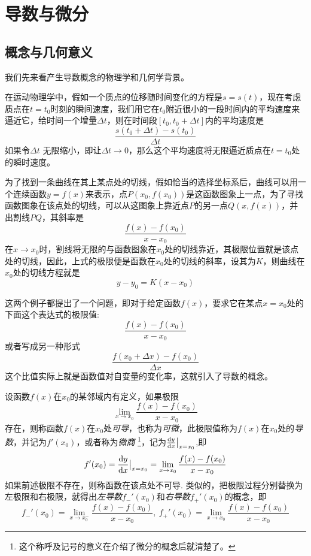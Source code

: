 
\section{导数与微分}
\label{sec:derivative-and-differtial}

\subsection{概念与几何意义}
\label{sec:concept-of-derivative}

我们先来看产生导数概念的物理学和几何学背景。

在运动物理学中，假如一个质点的位移随时间变化的方程是$s=s(t)$，现在考虑质点在$t=t_0$时刻的瞬间速度，我们用它在$t_0$附近很小的一段时间内的平均速度来逼近它，给时间一个增量$\Delta t$，则在时间段$[t_0,t_0+\Delta t]$内的平均速度是
\[ \frac{s(t_0+\Delta t)-s(t_0)}{\Delta t} \]
如果令$\Delta t$ 无限缩小，即让$\Delta t \to 0$，那么这个平均速度将无限逼近质点在$t=t_0$处的瞬时速度。

为了找到一条曲线在其上某点处的切线，假如恰当的选择坐标系后，曲线可以用一个连续函数$y=f(x)$来表示，点$P(x_0,f(x_0))$是这函数图象上一点，为了寻找函数图象在该点处的切线，可以从这图象上靠近点$P$的另一点$Q(x,f(x))$，并出割线$PQ$，其斜率是
\[ \frac{f(x)-f(x_0)}{x-x_0} \]
在$x \to x_0$时，割线将无限的与函数图象在$x_0$处的切线靠近，其极限位置就是该点处的切线，因此，上式的极限便是函数在$x_0$处的切线的斜率，设其为$K$，则曲线在$x_0$处的切线方程就是
\[ y-y_0 = K(x-x_0) \]

这两个例子都提出了一个问题，即对于给定函数$f(x)$，要求它在某点$x=x_0$处的下面这个表达式的极限值:
\[ \frac{f(x)-f(x_0)}{x-x_0} \]
或者写成另一种形式
\[ \frac{f(x_0+\Delta x)-f(x_0)}{\Delta x} \]
这个比值实际上就是函数值对自变量的变化率，这就引入了导数的概念。

\begin{definition}
  设函数$f(x)$在$x_0$的某邻域内有定义，如果极限
  \[ \lim_{x \to x_0} \frac{f(x)-f(x_0)}{x-x_0} \]
  存在，则称函数$f(x)$在$x_0$处\emph{可导}，也称为\emph{可微}，此极限值称为$f(x)$在$x_0$处的\emph{导数}，并记为$f'(x_0)$，或者称为\emph{微商} \footnote{这个称呼及记号的意义在介绍了微分的概念后就清楚了。}，记为$\frac{\mathop{}\!\mathrm{d} y}{\mathop{}\!\mathrm{d} x} \big| _{x=x_0} $,即
  \[ f'(x_0) = \frac{\mathop{}\!\mathrm{d} y}{\mathop{}\!\mathrm{d} x} \big| _{x=x_0} = \lim_{x \to x_0} \frac{f(x)-f(x_0)}{x-x_0} \]
  如果前述极限不存在，则称函数在该点处不可导. 类似的，把极限过程分别替换为左极限和右极限，就得出\emph{左导数}$f_-'(x_0)$和\emph{右导数}$f_+'(x_0)$的概念，即
  \[ f_-'(x_0) = \lim_{x \to x_0^-} \frac{f(x)-f(x_0)}{x-x_0}, \ f_+'(x_0) = \lim_{x \to x_0} \frac{f(x)-f(x_0)}{x-x_0} \]
\end{definition}

